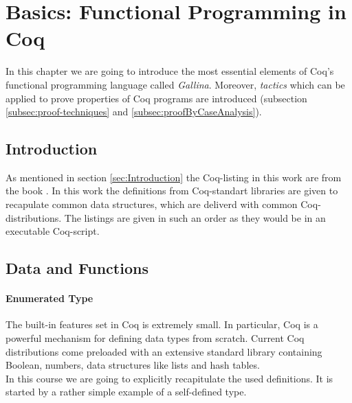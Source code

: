 \section{Basics: Functional Programming in Coq}
\label{sec:BasicFunctionalProgrammingInCoq}

	In this chapter we are going to introduce the most essential elements of Coq's functional programming language called {\itshape Gallina}. 
	Moreover, {\itshape tactics} which can be applied to prove properties of Coq programs are introduced (subsection \ref{subsec:proof-techniques} and \ref{subsec:proofByCaseAnalysis}).
	
	\subsection{Introduction}
	\label{subsec:Introduction}
	
	As mentioned in section \ref{sec:Introduction} the Coq-listing in this work are from the book \cite{PACGGHSY}. 
 	In this work the definitions from Coq-standart libraries are given to recapulate common data structures, which are deliverd with common Coq-distributions.	
	 The listings are given in such an order as they would be in an executable Coq-script.  
	
	\subsection{Data and Functions}
	\label{subSec:DataAndFuctions}
	
	 \paragraph{Enumerated Type}
	 \label{par:enumeratedType}
	 
	 
	  The built-in features set in Coq is extremely small. In particular, Coq is a powerful mechanism for defining data types from scratch.
	  Current Coq distributions come preloaded with an extensive standard library containing Boolean, numbers, data structures like lists and hash tables.\\
	  
	  In this course we are going to explicitly recapitulate the used definitions. 
	  It is started by a rather simple example of a self-defined type.  
	   
